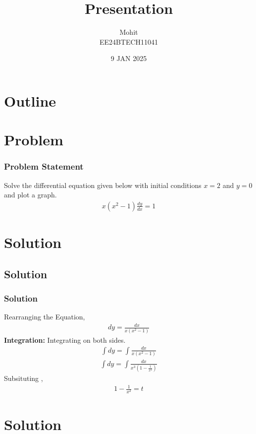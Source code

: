 \documentclass{beamer}
\title{Presentation}
\author{Mohit \\ EE24BTECH11041}
\date{9 JAN 2025}
\theoremstyle{remark}
\numberwithin{equation}{section}
\begin{document}
\begin{frame}
\titlepage
\end{frame}

\section*{Outline}
\begin{frame}
\tableofcontents
\end{frame}
\section{Problem}
\begin{frame}
\frametitle{Problem Statement}
%
Solve the differential equation given below with initial conditions $ x = 2 $ and $ y = 0 $ and plot a graph.
\begin{align}
	x(x^2-1)\frac{dy}{dx}=1
\end{align}

\end{frame}

\section{Solution}
\subsection{Solution}
\begin{frame}
\frametitle{Solution}


Rearranging the Equation,\\
    \begin{align}
	    dy = \frac{dx}{x(x^2-1)}
    \end{align}
    \textbf{Integration:} Integrating on both sides.\\   
    \begin{align}
    \int{dy} = \int{\frac{dx}{x(x^2-1)}} 
    \end{align}
    \begin{align}
    \int{dy} = \int{\frac{dx}{x^3(1-\frac{1}{x^2})}} 
    \end{align}
    Subsituting ,
    \begin{align}
    1-\frac{1}{x^2} = t
    \end{align}
    \end{frame}
    
    
    \section{Solution}
\end{document}
